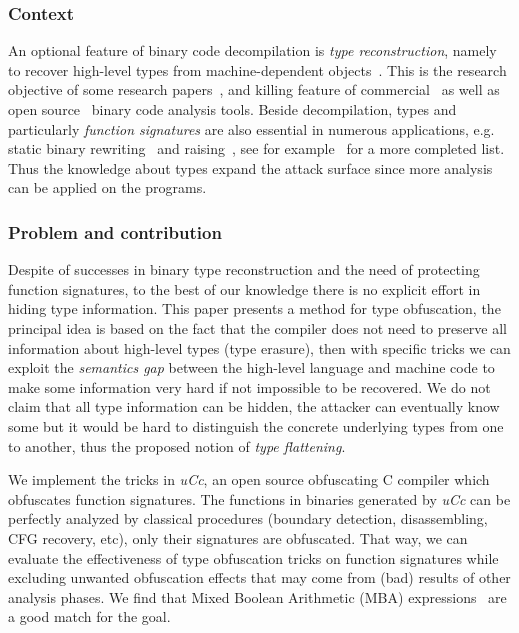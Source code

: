 \documentclass[compsoc,conference,a4paper,10pt,times]{IEEEtran}
\begin{document}
\subsubsection*{Context}
An optional feature of binary code decompilation is \emph{type reconstruction}, namely to recover high-level types from machine-dependent
objects~\cite{mycroft_type-based_1999, van_emmerik_static_2007}. This is the research objective of some
research papers~\cite{lee_tie_2011,elwazeer_scalable_2013,robbins_minx_2016,noonan_polymorphic_2016},
and killing feature of commercial~\cite{noauthor_hex-rays_nodate,noauthor_jeb_nodate}
as well as open source~\cite{noauthor_ghidra_nodate} binary code analysis tools. Beside decompilation,
types and particularly \emph{function signatures} are also essential in numerous applications,
e.g. static binary rewriting~\cite{bernat_anywhere_2011,anand_compiler-level_2013} and
raising~\cite{yadavalli_raising_2019,goodman_lifting_2018},
see for example~\cite{caballero_type_2016} for a more completed list. Thus the knowledge about types
expand the attack surface since more analysis can be applied on the programs.

\subsubsection*{Problem and contribution}
Despite of successes in binary type reconstruction and the need of protecting function signatures, to the best
of our knowledge there is no explicit effort in hiding type information. This paper presents a method
for type obfuscation, the principal idea is based on the fact that the compiler does not need to preserve all information
about high-level types (type erasure), then with specific tricks we can exploit the \emph{semantics gap} between
the high-level language and machine code to make some information very hard if not impossible
to be recovered. We do not claim that all type information can be hidden, the attacker can
eventually know some but it would be hard to distinguish the concrete underlying types from one to another,
thus the proposed notion of \emph{type flattening}.

We implement the tricks in \emph{uCc}, an open source obfuscating C compiler which obfuscates
function signatures. The functions in binaries generated by \emph{uCc} can be
perfectly analyzed by classical procedures (boundary detection, disassembling, CFG recovery, etc),
only their signatures are obfuscated. That way, we can evaluate the effectiveness of type
obfuscation tricks on function signatures while excluding unwanted obfuscation effects that may come from (bad) results
of other analysis phases.
We find that Mixed Boolean Arithmetic (MBA)
expressions~\cite{eyrolles_obfuscation_2017,zhou_information_2007} are a good match for the goal.
\end{document}
